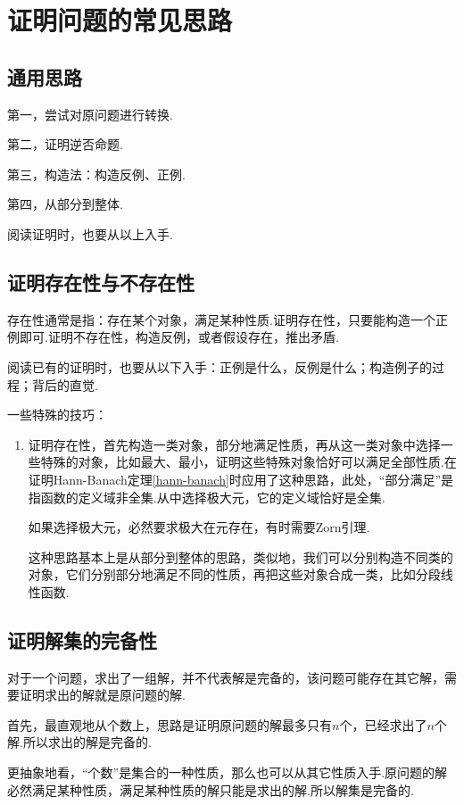 \chapter{证明问题的常见思路}
\section{通用思路}
第一，尝试对原问题进行转换.

第二，证明逆否命题.

第三，构造法：构造反例、正例.

第四，从部分到整体.

阅读证明时，也要从以上入手.

\section{证明存在性与不存在性}
存在性通常是指：存在某个对象，满足某种性质.证明存在性，只要能构造一个正例即可.证明不存在性，构造反例，或者假设存在，推出矛盾.

阅读已有的证明时，也要从以下入手：正例是什么，反例是什么；构造例子的过程；背后的直觉.

一些特殊的技巧：

\begin{enumerate}
\item 证明存在性，首先构造一类对象，部分地满足性质，再从这一类对象中选择一些特殊的对象，比如最大、最小，证明这些特殊对象恰好可以满足全部性质.在证明Hann-Banach定理\ref{hann-banach}时应用了这种思路，此处，“部分满足”是指函数的定义域非全集.从中选择极大元，它的定义域恰好是全集.

如果选择极大元，必然要求极大在元存在，有时需要Zorn引理.

这种思路基本上是从部分到整体的思路，类似地，我们可以分别构造不同类的对象，它们分别部分地满足不同的性质，再把这些对象合成一类，比如分段线性函数.

\end{enumerate}
\section{证明解集的完备性}

对于一个问题，求出了一组解，并不代表解是完备的，该问题可能存在其它解，需要证明求出的解就是原问题的解.

首先，最直观地从个数上，思路是证明原问题的解最多只有$n$个，已经求出了$n$个解.所以求出的解是完备的.

更抽象地看，“个数”是集合的一种性质，那么也可以从其它性质入手.原问题的解必然满足某种性质，满足某种性质的解只能是求出的解.所以解集是完备的.

